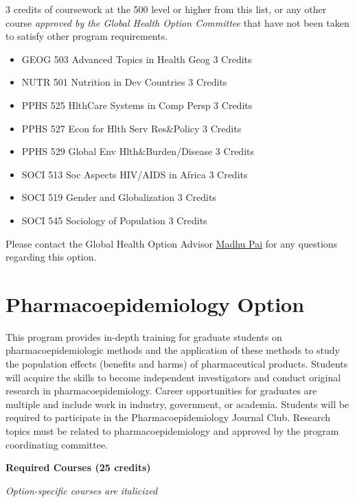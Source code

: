 \documentclass[
  openany]{book}
\providecommand{\tightlist}{%
  \setlength{\itemsep}{0pt}\setlength{\parskip}{0pt}}
\begin{document}
3 credits of coursework at the 500 level or higher from this list, or any other course \emph{approved by the Global Health Option Committee} that have not been taken to satisfy other program requirements.

\begin{itemize}
\tightlist
\item
  GEOG 503 Advanced Topics in Health Geog 3 Credits
\item
  NUTR 501 Nutrition in Dev Countries 3 Credits
\item
  PPHS 525 HlthCare Systems in Comp Persp 3 Credits
\item
  PPHS 527 Econ for Hlth Serv Res\&Policy 3 Credits
\item
  PPHS 529 Global Env Hlth\&Burden/Disease 3 Credits
\item
  SOCI 513 Soc Aspects HIV/AIDS in Africa 3 Credits
\item
  SOCI 519 Gender and Globalization 3 Credits
\item
  SOCI 545 Sociology of Population 3 Credits
\end{itemize}

Please contact the Global Health Option Advisor \href{mailto:madhukar.pai@mcgill.ca}{Madhu Pai} for any questions regarding this option.

\hypertarget{pharmacoepidemiology-option}{%
\section{Pharmacoepidemiology Option}\label{pharmacoepidemiology-option}}

This program provides in-depth training for graduate students on pharmacoepidemiologic methods and the application of these methods to study the population effects (benefits and harms) of pharmaceutical products. Students will acquire the skills to become independent investigators and conduct original research in pharmacoepidemiology. Career opportunities for graduates are multiple and include work in industry, government, or academia. Students will be required to participate in the Pharmacoepidemiology Journal Club. Research topics must be related to pharmacoepidemiology and approved by the program coordinating committee.

\textbf{Required Courses (25 credits)}

\emph{Option-specific courses are italicized}
\end{document}
